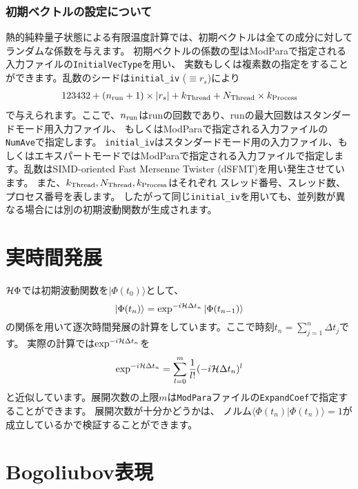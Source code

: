 \subsubsection*{初期ベクトルの設定について}
熱的純粋量子状態による有限温度計算では、初期ベクトルは全ての成分に対してランダムな係数を与えます。
初期ベクトルの係数の型はModParaで指定される入力ファイルの\verb|InitialVecType|を用い、
実数もしくは複素数の指定をすることができます。乱数のシードは\verb|initial_iv| ($\equiv r_s$)により
\begin{align}
123432+(n_{\rm run}+1)\times  |r_s|+k_{\rm Thread}+N_{\rm Thread} \times k_{\rm Process}
\end{align}
で与えられます。ここで、$n_{\rm run}$はrunの回数であり、runの最大回数はスタンダードモード用入力ファイル、
もしくはModParaで指定される入力ファイルの\verb|NumAve|で指定します。
\verb|initial_iv|はスタンダードモード用の入力ファイル、もしくはエキスパートモードではModParaで指定される入力ファイルで指定します。乱数はSIMD-oriented Fast Mersenne Twister (dSFMT)を用い発生させています\cite{Mutsuo2008}。
また、$k_{\rm Thread}, N_{\rm Thread}, k_{\rm Process}$はそれぞれ
スレッド番号、スレッド数、プロセス番号を表します。
したがって同じ\verb|initial_iv|を用いても、並列数が異なる場合には別の初期波動関数が生成されます。


\section{{実時間発展}}
\label{Ch:TE}
${\cal H}\Phi$では初期波動関数を$|\Phi(t_0)\rangle$として、
\begin{equation}
|\Phi (t_n)\rangle = \exp^{-i {\cal H}  \Delta t_n}|\Phi (t_{n-1})\rangle
\end{equation}
の関係を用いて逐次時間発展の計算をしています。ここで時刻$t_n = \sum_{j=1}^n  \Delta t_j $です。
実際の計算では$\exp^{-i {\cal H}  \Delta t_n}$を
\begin{equation}
\exp^{-i {\cal H}  \Delta t_n} =\sum_{l=0}^m \frac{1}{l!}(-i {\cal H}  \Delta t_n)^l
\end{equation}
と近似しています。展開次数の上限$m$は\verb|ModPara|ファイルの\verb|ExpandCoef|で指定することができます。
展開次数が十分かどうかは、
ノルム$\langle \Phi (t_n)|\Phi (t_n)\rangle=1$が成立しているかで検証することができます。

\section{Bogoliubov表現}\label{sec_bogoliubov_rep}

